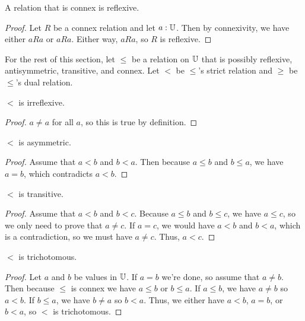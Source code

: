 \documentclass[../../math.tex]{subfiles}
\begin{document}
\begin{instance}
    A relation that is connex is reflexive.
\end{instance}
\begin{proof}
    Let $R$ be a connex relation and let $a : \mathbb{U}$.  Then by connexivity, we have
    either $aRa$ or $aRa$.  Either way, $aRa$, so $R$ is reflexive.
\end{proof}

For the rest of this section, let $\leq$ be a relation on $\mathbb{U}$ that is possibly
reflexive, antisymmetric, transitive, and connex.  Let $<$ be $\leq$'s strict
relation and $\geq$ be $\leq$'s dual relation.

\begin{instance}
    $<$ is irreflexive.
\end{instance}
\begin{proof}
    $a \neq a$ for all $a$, so this is true by definition.
\end{proof}

\begin{instance}
    $<$ is asymmetric.
\end{instance}
\begin{proof}
    Assume that $a < b$ and $b < a$.  Then because $a \leq b$ and $b \leq a$, we
    have $a = b$, which contradicts $a < b$.
\end{proof}

\begin{instance}
    $<$ is transitive.
\end{instance}
\begin{proof}
    Assume that $a < b$ and $b < c$.  Because $a \leq b$ and $b \leq c$, we have
    $a \leq c$, so we only need to prove that $a \neq c$.  If $a = c$, we would
    have $a < b$ and $b < a$, which is a contradiction, so we must have $a \neq
    c$.  Thus, $a < c$.
\end{proof}

\begin{instance}
    $<$ is trichotomous.
\end{instance}
\begin{proof}
    Let $a$ and $b$ be values in $\mathbb{U}$.  If $a = b$ we're done, so assume that $a
    \neq b$.  Then because $\leq$ is connex we have $a \leq b$ or $b \leq a$.
    If $a \leq b$, we have $a \neq b$ so $a < b$.  If $b \leq a$, we have $b
    \neq a$ so $b < a$.  Thus, we either have $a < b$, $a = b$, or $b < a$, so
    $<$ is trichotomous.
\end{proof}
\end{document}
